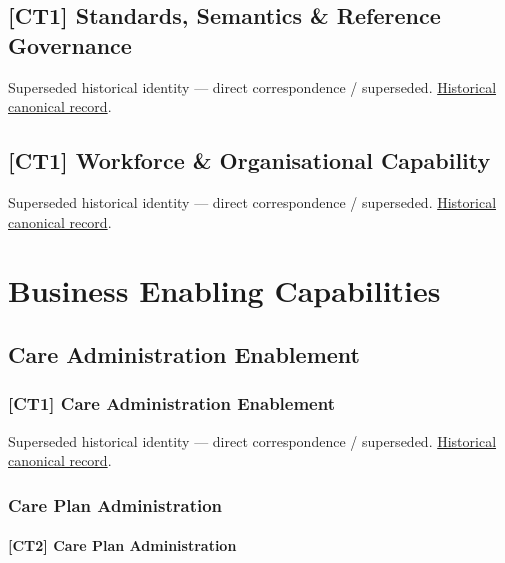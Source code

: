 \subsection{[CT1] Standards, Semantics \& Reference Governance}

\par\label{element:3b65a3d007f54aa9b875e655475e1786}
Superseded historical identity — direct correspondence / superseded. \href{../../../../continuum/strategy/capability/3b65a3d007f54aa9b875e655475e1786.md}{Historical canonical record}.\par

\subsection{[CT1] Workforce \& Organisational Capability}

\par\label{element:b1161fe1a315420fbc7d048a1ea58126}
Superseded historical identity — direct correspondence / superseded. \href{../../../../continuum/strategy/capability/b1161fe1a315420fbc7d048a1ea58126.md}{Historical canonical record}.\par

\section{Business Enabling Capabilities}

\subsection{Care Administration Enablement}

\subsubsection{[CT1] Care Administration Enablement}

\par\label{element:b611a1fcfadb4b30af9ba74a4c993d8a}
Superseded historical identity — direct correspondence / superseded. \href{../../../../continuum/strategy/capability/b611a1fcfadb4b30af9ba74a4c993d8a.md}{Historical canonical record}.\par

\subsubsection{Care Plan Administration}

\paragraph{[CT2] Care Plan Administration}

